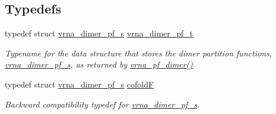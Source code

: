 \subsection*{Typedefs}
\begin{DoxyCompactItemize}
\item 
\mbox{\label{group__pf__cofold_ga444df1587c9a2ca15b8eb25188f629c3}} 
typedef struct \mbox{\hyperlink{group__part__func__global_structvrna__dimer__pf__s}{vrna\+\_\+dimer\+\_\+pf\+\_\+s}} \mbox{\hyperlink{group__pf__cofold_ga444df1587c9a2ca15b8eb25188f629c3}{vrna\+\_\+dimer\+\_\+pf\+\_\+t}}
\begin{DoxyCompactList}\small\item\em Typename for the data structure that stores the dimer partition functions, \mbox{\hyperlink{group__part__func__global_structvrna__dimer__pf__s}{vrna\+\_\+dimer\+\_\+pf\+\_\+s}}, as returned by \mbox{\hyperlink{group__part__func__global_ga4e5c7d06c302a7c59fc0d64dc142ca63}{vrna\+\_\+pf\+\_\+dimer()}} \end{DoxyCompactList}\item 
\mbox{\label{group__pf__cofold_ga5445d8d96a40e9e79b1fa5a7f1a6b7ea}} 
typedef struct \mbox{\hyperlink{group__part__func__global_structvrna__dimer__pf__s}{vrna\+\_\+dimer\+\_\+pf\+\_\+s}} \mbox{\hyperlink{group__pf__cofold_ga5445d8d96a40e9e79b1fa5a7f1a6b7ea}{cofoldF}}
\begin{DoxyCompactList}\small\item\em Backward compatibility typedef for \mbox{\hyperlink{group__part__func__global_structvrna__dimer__pf__s}{vrna\+\_\+dimer\+\_\+pf\+\_\+s}}. \end{DoxyCompactList}\end{DoxyCompactItemize}
